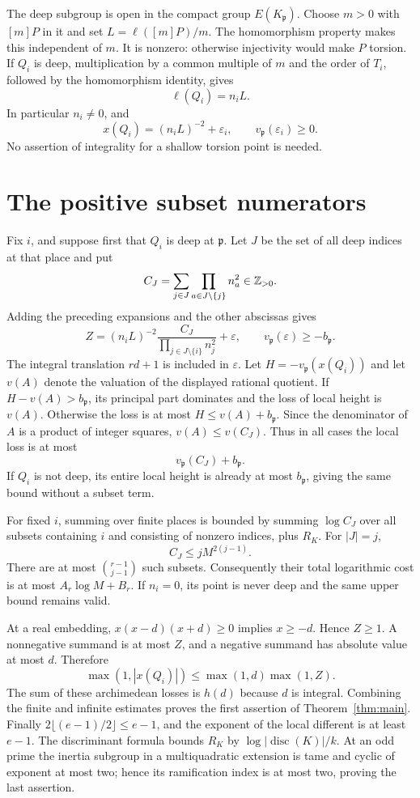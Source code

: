 \documentclass[11pt,a4paper]{article}
\begin{document}
The deep subgroup is open in the compact group $E(K_\mathfrak p)$.
Choose $m>0$ with $[m]P$ in it and set $L=\ell([m]P)/m$.
The homomorphism property makes this independent of $m$.
It is nonzero: otherwise injectivity would make $P$ torsion.
If $Q_i$ is deep, multiplication by a common multiple of $m$ and
the order of $T_i$, followed by the homomorphism identity, gives
\[
 \ell(Q_i)=n_iL.
\]
In particular $n_i\ne0$, and
\[
 x(Q_i)=(n_iL)^{-2}+\varepsilon_i,
 \qquad v_\mathfrak p(\varepsilon_i)\ge0.
\]
No assertion of integrality for a shallow torsion point is needed.

\section{The positive subset numerators}

Fix $i$, and suppose first that $Q_i$ is deep at $\mathfrak p$.
Let $J$ be the set of all deep indices at that place and put
\[
 C_J=\sum_{j\in J}\prod_{a\in J\setminus\{j\}}n_a^2
       \in\mathbb Z_{>0}.
\]
Adding the preceding expansions and the other abscissas gives
\[
 Z=(n_iL)^{-2}
      \frac{C_J}{\prod_{j\in J\setminus\{i\}}n_j^2}
      +\varepsilon,
 \qquad v_\mathfrak p(\varepsilon)\ge-b_\mathfrak p.
\]
The integral translation $rd+1$ is included in $\varepsilon$.
Let $H=-v_\mathfrak p(x(Q_i))$ and let $v(A)$ denote the
valuation of the displayed rational quotient.
If $H-v(A)>b_\mathfrak p$, its principal part dominates and
the loss of local height is $v(A)$. Otherwise the loss is at
most $H\le v(A)+b_\mathfrak p$. Since the denominator of $A$
is a product of integer squares, $v(A)\le v(C_J)$.
Thus in all cases the local loss is at most
\[
 v_\mathfrak p(C_J)+b_\mathfrak p.
\]
If $Q_i$ is not deep, its entire local height is already at most
$b_\mathfrak p$, giving the same bound without a subset term.

For fixed $i$, summing over finite places is bounded by summing
$\log C_J$ over all subsets containing $i$ and consisting of
nonzero indices, plus $R_K$. For $|J|=j$,
\[
 C_J\le jM^{2(j-1)}.
\]
There are at most $\binom{r-1}{j-1}$ such subsets.
Consequently their total logarithmic cost is at most
$A_r\log M+B_r$. If $n_i=0$, its point is never deep and the
same upper bound remains valid.

At a real embedding, $x(x-d)(x+d)\ge0$ implies $x\ge-d$.
Hence $Z\ge1$. A nonnegative summand is at most $Z$, and a
negative summand has absolute value at most $d$. Therefore
\[
 \max(1,|x(Q_i)|)\le\max(1,d)\max(1,Z).
\]
The sum of these archimedean losses is $h(d)$ because $d$ is
integral. Combining the finite and infinite estimates proves the
first assertion of Theorem~\ref{thm:main}.
Finally $2\lfloor(e-1)/2\rfloor\le e-1$, and the exponent of
the local different is at least $e-1$. The discriminant formula
bounds $R_K$ by $\log|\operatorname{disc}(K)|/k$.
At an odd prime the inertia subgroup in a multiquadratic extension
is tame and cyclic of exponent at most two; hence its ramification
index is at most two, proving the last assertion.
\end{document}
